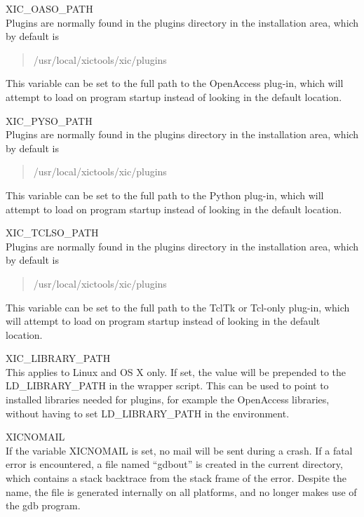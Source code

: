 \begin{description}
{}
\item{\et XIC\_OASO\_PATH}\\
Plugins are normally found in the {\vt plugins} directory in the
installation area, which by default is
\begin{quote}
\vt /usr/local/xictools/xic/plugins
\end{quote}
This variable can be set to the full path to the OpenAccess plug-in,
which {\Xic} will attempt to load on program startup instead of
looking in the default location.

\item{\et XIC\_PYSO\_PATH}\\
Plugins are normally found in the {\vt plugins} directory in the
installation area, which by default is
\begin{quote}
\vt /usr/local/xictools/xic/plugins
\end{quote}
This variable can be set to the full path to the Python plug-in,
which {\Xic} will attempt to load on program startup instead of
looking in the default location.

\item{\et XIC\_TCLSO\_PATH}\\
Plugins are normally found in the {\vt plugins} directory in the
installation area, which by default is
\begin{quote}
\vt /usr/local/xictools/xic/plugins
\end{quote}
This variable can be set to the full path to the TclTk or Tcl-only
plug-in, which {\Xic} will attempt to load on program startup instead
of looking in the default location.

\item{\et XIC\_LIBRARY\_PATH}\\
This applies to Linux and OS X only.  If set, the value will be
prepended to the {\vt LD\_LIBRARY\_PATH} in the {\Xic} wrapper script. 
This can be used to point to installed libraries needed for plugins,
for example the OpenAccess libraries,
without having to set {\vt LD\_LIBRARY\_PATH} in the environment. 

\item{\et XICNOMAIL}\\
If the variable {\et XICNOMAIL} is set, no mail will be sent during a
crash.  If a fatal error is encountered, a file named ``{\vt gdbout}''
is created in the current directory, which contains a stack backtrace
from the stack frame of the error.  Despite the name, the file is
generated internally on all platforms, and no longer makes use of the
{\vt gdb} program.
 

\end{description}
